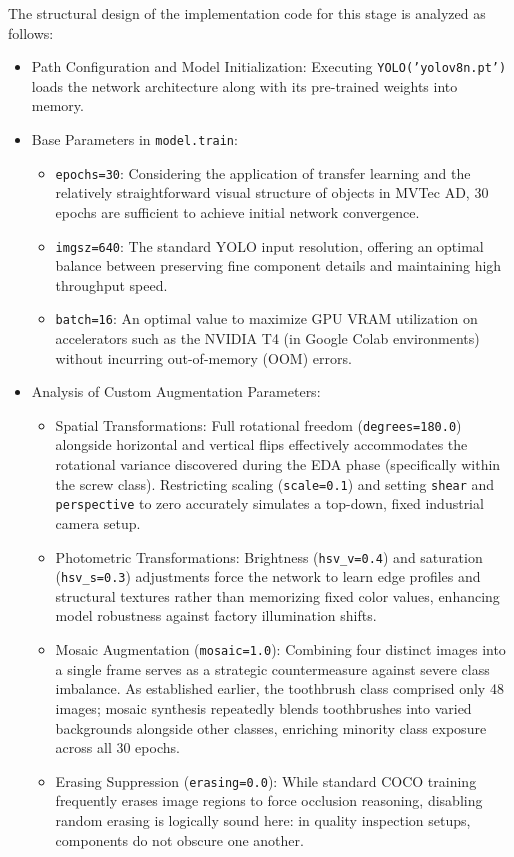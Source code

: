 \documentclass{article}
\begin{document}
The structural design of the implementation code for this stage is analyzed as follows:

\begin{itemize}
	
	\item Path Configuration and Model Initialization: Executing \texttt{YOLO('yolov8n.pt')} loads the network architecture along with its pre-trained weights into memory.
	
	\item Base Parameters in \texttt{model.train}:
	\begin{itemize}
		\item \texttt{epochs=30}: Considering the application of transfer learning and the relatively straightforward visual structure of objects in MVTec AD, 30 epochs are sufficient to achieve initial network convergence.
		\item \texttt{imgsz=640}: The standard YOLO input resolution, offering an optimal balance between preserving fine component details and maintaining high throughput speed.
		\item \texttt{batch=16}: An optimal value to maximize GPU VRAM utilization on accelerators such as the NVIDIA T4 (in Google Colab environments) without incurring out-of-memory (OOM) errors.
	\end{itemize}
	
	\item Analysis of Custom Augmentation Parameters:
	\begin{itemize}
		\item Spatial Transformations: Full rotational freedom (\texttt{degrees=180.0}) alongside horizontal and vertical flips effectively accommodates the rotational variance discovered during the EDA phase (specifically within the screw class). Restricting scaling (\texttt{scale=0.1}) and setting \texttt{shear} and \texttt{perspective} to zero accurately simulates a top-down, fixed industrial camera setup.
		\item Photometric Transformations: Brightness (\texttt{hsv\_v=0.4}) and saturation (\texttt{hsv\_s=0.3}) adjustments force the network to learn edge profiles and structural textures rather than memorizing fixed color values, enhancing model robustness against factory illumination shifts.
		\item Mosaic Augmentation (\texttt{mosaic=1.0}): Combining four distinct images into a single frame serves as a strategic countermeasure against severe class imbalance. As established earlier, the toothbrush class comprised only 48 images; mosaic synthesis repeatedly blends toothbrushes into varied backgrounds alongside other classes, enriching minority class exposure across all 30 epochs.
		\item Erasing Suppression (\texttt{erasing=0.0}): While standard COCO training frequently erases image regions to force occlusion reasoning, disabling random erasing is logically sound here: in quality inspection setups, components do not obscure one another.
	\end{itemize}
\end{itemize}
\end{document}
